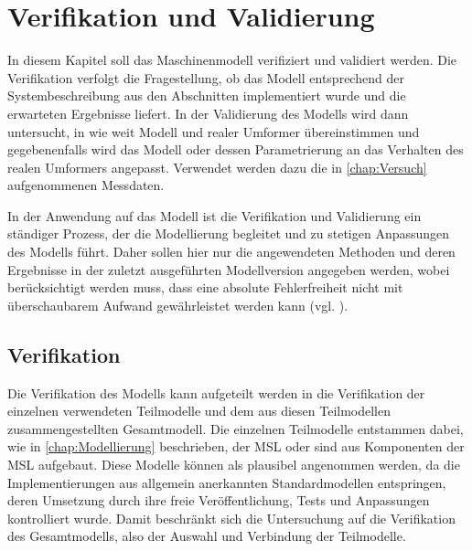 \chapter{Verifikation und Validierung}
\label{chap:VerfikationValidierung}
In diesem Kapitel soll das Maschinenmodell verifiziert und validiert werden. Die Verifikation verfolgt die Fragestellung, ob das Modell entsprechend der Systembeschreibung aus den Abschnitten  implementiert wurde und die erwarteten Ergebnisse liefert. In der Validierung des Modells wird dann untersucht, in wie weit Modell und realer Umformer übereinstimmen und gegebenenfalls wird das Modell oder dessen Parametrierung an das Verhalten des realen Umformers angepasst. Verwendet werden dazu die in \cref{chap:Versuch} aufgenommenen Messdaten. 

In der Anwendung auf das Modell ist die Verifikation und Validierung ein ständiger Prozess, der die Modellierung begleitet und zu stetigen Anpassungen des Modells führt. Daher sollen hier nur die angewendeten Methoden und deren Ergebnisse in der zuletzt ausgeführten Modellversion angegeben werden, wobei berücksichtigt werden muss, dass eine absolute Fehlerfreiheit nicht mit überschaubarem Aufwand gewährleistet werden kann (vgl. \cite[S.~14ff.]{rabeVerifikationUndValidierung2008}).
 
\section{Verifikation}
\label{sec:Verifkation}
Die Verifikation des Modells kann aufgeteilt werden in die Verifikation der einzelnen verwendeten Teilmodelle und dem aus diesen Teilmodellen zusammengestellten Gesamtmodell. Die einzelnen Teilmodelle entstammen dabei, wie in \cref{chap:Modellierung} beschrieben, der MSL oder sind aus Komponenten der MSL aufgebaut. Diese Modelle können als plausibel angenommen werden, da die Implementierungen aus allgemein anerkannten Standardmodellen entspringen, deren Umsetzung durch ihre freie Veröffentlichung, Tests und Anpassungen kontrolliert wurde. Damit beschränkt sich die Untersuchung auf die Verifikation des Gesamtmodells, also der Auswahl und Verbindung der Teilmodelle. 

